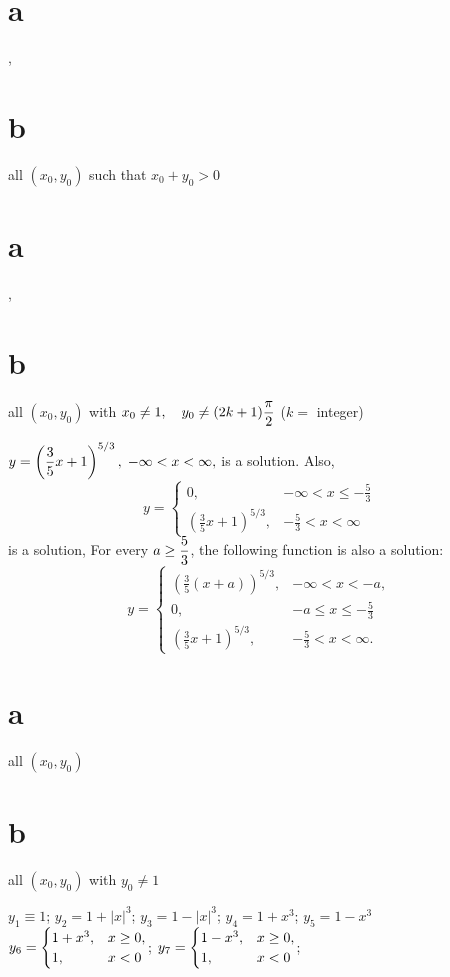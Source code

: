   \part{a}, \part{b} all $(x_0,y_0)$
such that $x_0+y_0>0$

 \part{a}, \part{b} all
$(x_0,y_0)$ with $x_0\ne 1,\quad y_0\ne(2k+1)\displaystyle{\frac{\pi}{2}}$ ($k=$
integer)

$\displaystyle{y = \left( \frac{3}{5}
x+1 \right)^{5/3},\;  - \infty < x < \infty,}$ is a solution.
Also,
\[
y =
\begin{cases}
0, &  -\infty< x \le -\frac{5}{3} \\[3pt]
\left(\frac{3}{5}x + 1\right)^{5/3}, & -\frac{5}{3} < x < \infty
\end{cases}
\]
is a solution,
For every $\displaystyle{a \ge \frac{5}{3}}$, the following function is also a
solution:
\[
y =
\begin{cases}
\left( \frac{3}{5} (x+a) \right)^{5/3}, & - \infty < x < -a, \\[3pt]
0, &  -a \le x \le -\frac{5}{3} \\[3pt]
\left(\frac{3}{5}x + 1\right)^{5/3}, & -\frac{5}{3} < x < \infty.
\end{cases}
\]


  \part{a} all $(x_0,y_0)$  \part{b}
all $(x_0,y_0)$ with $y_0\ne1$

$y_1\equiv1$;   $y_2=1+|x|^3$;   $y_3=1-|x|^3$;   $y_4=1+x^3$;
$y_5=1-x^3$
$y_6=\displaystyle{\begin{cases}1+x^3,&x\ge 0,\\
1,&x<0\end{cases}}$;  \quad
$y_7=\displaystyle{\begin{cases}1-x^3,&x\ge 0,\\
1,&x<0\end{cases}}$;

